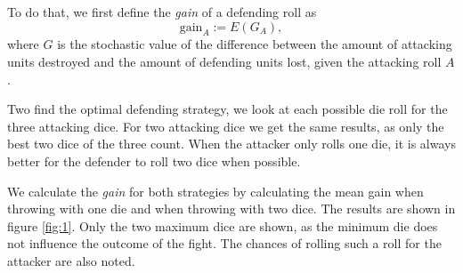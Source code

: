 \documentclass{amsart}
\begin{document}
	To do that, we first define the \emph{gain} of a defending roll as
	$$
		\text{gain}_A := E(G_A),
	$$ where $G$ is the stochastic value of the difference between the amount of attacking units destroyed and the amount of defending units lost, given the attacking roll $A$.
	
	Two find the optimal defending strategy, we look at each possible die roll for the three attacking dice. For two attacking dice we get the same results, as only the best two dice of the three count. When the attacker only rolls one die, it is always better for the defender to roll two dice when possible.
	
	We calculate the \emph{gain} for both strategies by calculating the mean gain when throwing with one die and when throwing with two dice. The results are shown in figure \ref{fig:1}. Only the two maximum dice are shown, as the minimum die does not influence the outcome of the fight. The chances of rolling such a roll for the attacker are also noted. 
	
\end{document}
